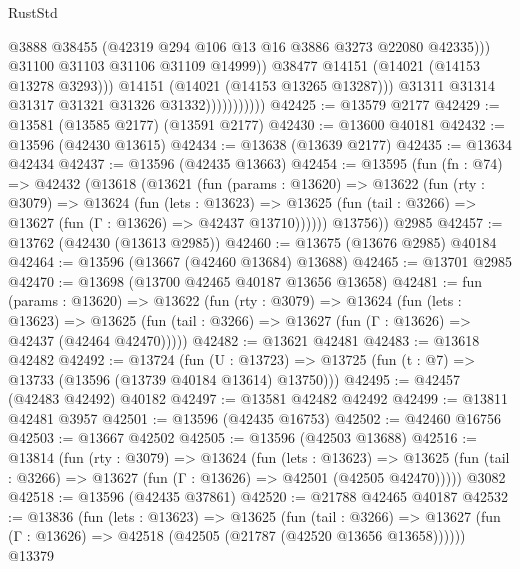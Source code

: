 \begin{lexlean}{RustStd}
\begin{coremodule}
                                      @3888
                                      @38455
                                      (@42319 @294 @106 @13 @16 @3886 @3273 @22080 @42335)))
                                  @31100
                                  @31103
                                  @31106
                                  @31109
                                  @14999))
                              @38477
                              @14151
                              (@14021 (@14153 @13278 @3293)))
                            @14151
                            (@14021 (@14153 @13265 @13287)))
                          @31311
                          @31314
                          @31317
                          @31321
                          @31326
                          @31332)))))))))))
@42425 := @13579 @2177
@42429 := @13581 (@13585 @2177) (@13591 @2177)
@42430 := @13600 @40181
@42432 := @13596 (@42430 @13615)
@42434 := @13638 (@13639 @2177)
@42435 := @13634 @42434
@42437 := @13596 (@42435 @13663)
@42454 := @13595
    (fun (fn : @74) =>
    @42432
      (@13618
        (@13621
          (fun (params : @13620) =>
          @13622
            (fun (rty : @3079) =>
            @13624
              (fun (lets : @13623) =>
              @13625 (fun (tail : @3266) => @13627 (fun (Γ : @13626) => @42437 @13710))))))
        @13756))
    @2985
@42457 := @13762 (@42430 (@13613 @2985))
@42460 := @13675 (@13676 @2985) @40184
@42464 := @13596 (@13667 (@42460 @13684) @13688)
@42465 := @13701 @2985
@42470 := @13698 (@13700 @42465 @40187 @13656 @13658)
@42481 := fun (params : @13620) =>
  @13622
    (fun (rty : @3079) =>
    @13624
      (fun (lets : @13623) =>
      @13625 (fun (tail : @3266) => @13627 (fun (Γ : @13626) => @42437 (@42464 @42470)))))
@42482 := @13621 @42481
@42483 := @13618 @42482
@42492 := @13724
    (fun (U : @13723) => @13725 (fun (t : @7) => @13733 (@13596 (@13739 @40184 @13614) @13750)))
@42495 := @42457 (@42483 @42492) @40182
@42497 := @13581 @42482 @42492
@42499 := @13811 @42481 @3957
@42501 := @13596 (@42435 @16753)
@42502 := @42460 @16756
@42503 := @13667 @42502
@42505 := @13596 (@42503 @13688)
@42516 := @13814
    (fun (rty : @3079) =>
    @13624
      (fun (lets : @13623) =>
      @13625 (fun (tail : @3266) => @13627 (fun (Γ : @13626) => @42501 (@42505 @42470)))))
    @3082
@42518 := @13596 (@42435 @37861)
@42520 := @21788 @42465 @40187
@42532 := @13836
    (fun (lets : @13623) =>
    @13625
      (fun (tail : @3266) =>
      @13627 (fun (Γ : @13626) => @42518 (@42505 (@21787 (@42520 @13656 @13658))))))
    @13379

\end{coremodule}
\end{lexlean}
